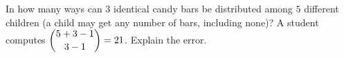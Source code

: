 In how many ways can $3$ identical candy bars be distributed among $5$ different children (a child may get any number of bars, including none)? A student computes $\dbinom{5+3-1}{3-1}=21$. Explain the error.

